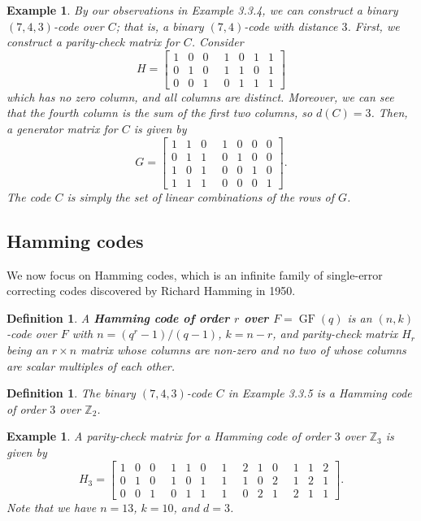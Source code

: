\documentclass[10pt]{article}
\newcommand{\Z}{\mathbb{Z}}
\DeclareMathOperator{\GF}{GF}
\theoremstyle{newstyle}
\newtheorem{defn}[thm]{Definition}
\newtheorem{exmp}[thm]{Example}
\begin{document}
\begin{exmp}
By our observations in Example 3.3.4, we can construct a binary $(7, 4, 3)$-code over $C$; 
that is, a binary $(7, 4)$-code with distance $3$. First, we construct a parity-check matrix for $C$. 
Consider 
\[ H = \left[
\begin{array}{ccc|cccc}
1 & 0 & 0 \;&\; 1 & 0 & 1 & 1 \\ 0 & 1 & 0 \;&\; 1 & 1 & 0 & 1 \\ 0 & 0 & 1 \;&\; 0 & 
1 & 1 & 1 \end{array}
\right] \]
which has no zero column, and all columns are distinct. Moreover, we can see that the fourth 
column is the sum of the first two columns, so $d(C) = 3$. Then, a generator matrix for $C$ is 
given by 
\[ G = \left[
\begin{array}{ccc|cccc}
1 & 1 & 0 \;&\; 1 & 0 & 0 & 0 \\
0 & 1 & 1 \;&\; 0 & 1 & 0 & 0 \\ 
1 & 0 & 1 \;&\; 0 & 0 & 1 & 0 \\ 
1 & 1 & 1 \;&\; 0 & 0 & 0 & 1 \end{array}
\right]. \]
The code $C$ is simply the set of linear combinations of the rows of $G$. 
\end{exmp}

\subsection{Hamming codes}

We now focus on Hamming codes, which is an infinite family of single-error correcting codes discovered by Richard 
Hamming in 1950. 

\begin{defn}
A {\bf Hamming code of order $r$ over $F = \GF(q)$} is an $(n, k)$-code over $F$ with 
$n = (q^r - 1)/(q-1)$, $k = n-r$, and parity-check matrix $H_r$ being an $r \times n$ matrix 
whose columns are non-zero and no two of whose columns are scalar multiples of each other. 
\end{defn}

\begin{defn}
The binary $(7, 4, 3)$-code $C$ in Example 3.3.5 is a Hamming code of order $3$ over $\Z_2$. 
\end{defn}

\begin{exmp}
A parity-check matrix for a Hamming code of order $3$ over $\Z_3$ is given by 
\[ H_3 = \left[
\begin{array}{ccc|ccc|c|ccc|ccc}
1 & 0 & 0 \;&\; 1 & 1 & 0 \;&\; 1 \;&\; 2 & 1 & 0 \;&\; 1 & 1 & 2 \\
0 & 1 & 0 \;&\; 1 & 0 & 1 \;&\; 1 \;&\; 1 & 0 & 2 \;&\; 1 & 2 & 1 \\ 
0 & 0 & 1 \;&\; 0 & 1 & 1 \;&\; 1 \;&\; 0 & 2 & 1 \;&\; 2 & 1 & 1 \end{array}
\right]. \] 
Note that we have $n = 13$, $k = 10$, and $d = 3$. 
\end{exmp}
\end{document}
